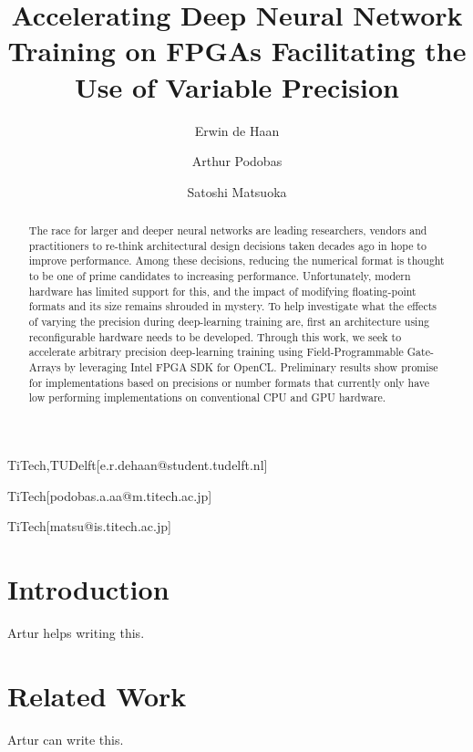 \documentclass[techrep,english]{ipsj}
\begin{document}
\title{Accelerating Deep Neural Network Training on FPGAs Facilitating the Use of Variable Precision}


\author{Erwin de Haan}{TiTech,TUDelft}[e.r.dehaan@student.tudelft.nl]
\author{Arthur Podobas}{TiTech}[podobas.a.aa@m.titech.ac.jp]
\author{Satoshi Matsuoka}{TiTech}[matsu@is.titech.ac.jp]

\begin{abstract}
The race for larger and deeper neural networks are leading researchers, vendors and practitioners to re-think architectural design decisions taken decades ago in hope to improve performance.
Among these decisions, reducing the numerical format is thought to be one of prime candidates to increasing performance.
Unfortunately, modern hardware has limited support for this, and the impact of modifying floating-point formats and its size remains shrouded in mystery.
To help investigate what the effects of varying the precision during deep-learning training are, first an architecture using reconfigurable hardware needs to be developed.
Through this work, we seek to accelerate arbitrary precision deep-learning training using Field-Programmable Gate-Arrays by leveraging Intel FPGA SDK for OpenCL.
Preliminary results show promise for implementations based on precisions or number formats that currently only have low performing implementations on conventional CPU and GPU hardware.
\end{abstract}


\maketitle

\section{Introduction}
Artur helps writing this.

\section{Related Work}
Artur can write this.
\end{document}
